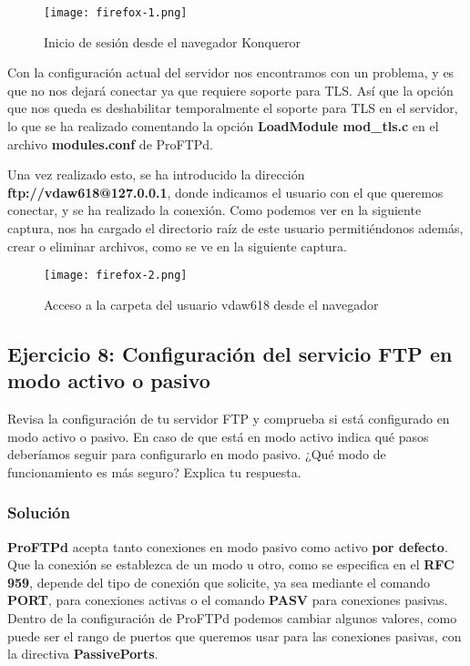 \begin{figure}[H]
    \centering
    \texttt{[image: firefox-1.png]}
    \caption{Inicio de sesión desde el navegador Konqueror}
\end{figure}

Con la configuración actual del servidor nos encontramos con un problema, y es que no nos dejará conectar ya que requiere soporte para TLS. Así que la opción que nos queda es deshabilitar temporalmente el soporte para TLS en el servidor, lo que se ha realizado comentando la opción \textbf{LoadModule mod\_tls.c} en el archivo \textbf{modules.conf} de ProFTPd.

Una vez realizado esto, se ha introducido la dirección \textbf{ftp://vdaw618@127.0.0.1}, donde indicamos el usuario con el que queremos conectar, y se ha realizado la conexión. Como podemos ver en la siguiente captura, nos ha cargado el directorio raíz de este usuario permitiéndonos además, crear o eliminar archivos, como se ve en la siguiente captura.
\begin{figure}[H]
    \centering
    \texttt{[image: firefox-2.png]}
    \caption{Acceso a la carpeta del usuario vdaw618 desde el navegador}
\end{figure}

\subsection{Ejercicio 8: Configuración del servicio FTP en modo activo o pasivo}
Revisa la configuración de tu servidor FTP y comprueba si está configurado en modo activo o pasivo. En caso de que está en modo activo indica qué pasos deberíamos seguir para configurarlo en modo pasivo. ¿Qué modo de funcionamiento es más seguro? Explica tu respuesta.

\subsubsection{Solución}
\textbf{ProFTPd} acepta tanto conexiones en modo pasivo como activo \textbf{por defecto}. Que la conexión se establezca de un modo u otro, como se especifica en el \textbf{RFC 959}, depende del tipo de conexión que solicite, ya sea mediante el comando \textbf{PORT}, para conexiones activas o el comando \textbf{PASV} para conexiones pasivas. Dentro de la configuración de ProFTPd podemos cambiar algunos valores, como puede ser el rango de puertos que queremos usar para las conexiones pasivas, con la directiva \textbf{PassivePorts}.


